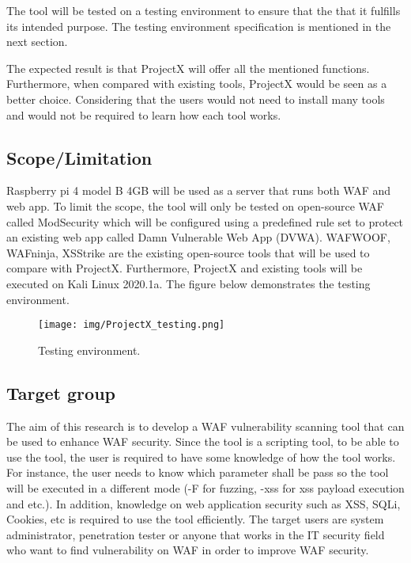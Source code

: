 \documentclass[a4paper,12pt]{article}
\begin{document}
The tool will be tested on a testing environment to ensure that the that it fulfills its intended purpose. The testing environment specification is mentioned in the next section.

The expected result is that ProjectX will offer all the mentioned functions. Furthermore, when compared with existing tools, ProjectX would be seen as a better choice. Considering that the users would not need to install many tools and would not be required to learn how each tool works.

\subsection{Scope/Limitation}
Raspberry pi 4 model B 4GB will be used as a server that runs both WAF and web app. To limit the scope, the tool will only be tested on open-source WAF called ModSecurity which will be configured using a predefined rule set to protect an existing web app called Damn Vulnerable Web App (DVWA). WAFWOOF, WAFninja, XSStrike are the existing open-source tools that will be used to compare with ProjectX. Furthermore, ProjectX and existing tools will be executed on Kali Linux 2020.1a. The figure below demonstrates the testing environment.

\begin{figure}[ht!]
\begin{center}
\texttt{[image: img/ProjectX\_testing.png]}
\end{center}
\caption{Testing environment.}
\label{testenviro}
\end{figure}


\subsection{Target group}
The aim of this research is to develop a WAF vulnerability scanning tool that can be used to enhance WAF security. Since the tool is a scripting tool, to be able to use the tool, the user is required to have some knowledge of how the tool works. For instance, the user needs to know which parameter shall be pass so the tool will be executed in a different mode (-F for fuzzing, -xss for xss payload execution and etc.). In addition, knowledge on web application security such as XSS, SQLi, Cookies, etc is required to use the tool efficiently. The target users are system administrator, penetration tester or anyone that works in the IT security field who want to find vulnerability on WAF in order to improve WAF security.
\end{document}
